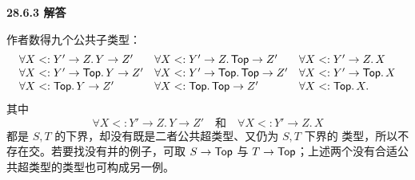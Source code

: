 \begin{taplauthorsolutionentrybox}
\label{sol:author:28.6.3}
\textbf{28.6.3 解答}

作者数得九个公共子类型：
\[
\begin{array}{lll}
\forall X<:Y'\to Z.\,Y\to Z'&
\forall X<:Y'\to Z.\,\mathsf{Top}\to Z'&
\forall X<:Y'\to Z.\,X\\
\forall X<:Y'\to\mathsf{Top}.\,Y\to Z'&
\forall X<:Y'\to\mathsf{Top}.\,\mathsf{Top}\to Z'&
\forall X<:Y'\to\mathsf{Top}.\,X\\
\forall X<:\mathsf{Top}.\,Y\to Z'&
\forall X<:\mathsf{Top}.\,\mathsf{Top}\to Z'&
\forall X<:\mathsf{Top}.\,X.
\end{array}
\]
其中
\[
\forall X<:Y'\to Z.\,Y\to Z'
\quad\text{和}\quad
\forall X<:Y'\to Z.\,X
\]
都是 \(S,T\) 的下界，却没有既是二者公共超类型、又仍为 \(S,T\) 下界的
类型，所以不存在交。若要找没有并的例子，可取 \(S\to\mathsf{Top}\) 与
\(T\to\mathsf{Top}\)；上述两个没有合适公共超类型的类型也可构成另一例。
\end{taplauthorsolutionentrybox}

